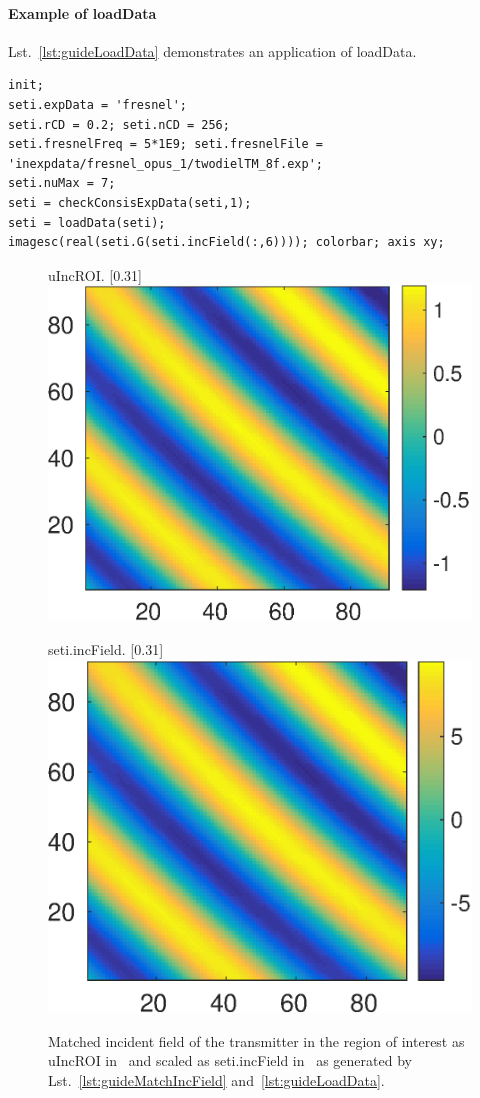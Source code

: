 \documentclass[a4paper]{article}
\begin{document}
\paragraph{Example of \textsf{loadData}} Lst.~\ref{lst:guideLoadData} demonstrates an application of \textsf{loadData}.

\begin{lstlisting}[caption={Process Institute Fresnel's data with \textsf{loadData} (\emph{source code}: \textsf{guides/guideLoadData.m}).},label=lst:guideLoadData]
init;
seti.expData = 'fresnel';
seti.rCD = 0.2; seti.nCD = 256;
seti.fresnelFreq = 5*1E9; seti.fresnelFile = 'inexpdata/fresnel_opus_1/twodielTM_8f.exp';
seti.nuMax = 7;
seti = checkConsisExpData(seti,1);
seti = loadData(seti);
imagesc(real(seti.G(seti.incField(:,6)))); colorbar; axis xy;
\end{lstlisting}

\begin{figure}
\centering
\begin{subcaptionbox}{\textsf{uIncROI}.
  \label{fig:guide:matchIncField}}[0.31\textwidth]{
  \includegraphics[height=0.22\textwidth]{figs/fig_guideMatchIncField}
  }
\end{subcaptionbox}
\begin{subcaptionbox}{\textsf{seti.incField}.
  \label{fig:guide:LoadData}}[0.31\textwidth]{
  \includegraphics[height=0.22\textwidth]{figs/fig_guideLoadData}
  }
\end{subcaptionbox}
\caption{Matched incident field of the  transmitter in the region of interest as \textsf{uIncROI} in~ and scaled as \textsf{seti.incField} in~ as generated by Lst.~\ref{lst:guideMatchIncField} and~\ref{lst:guideLoadData}.}
\label{fig:guide:FresnelMatch}
\end{figure}
\end{document}
